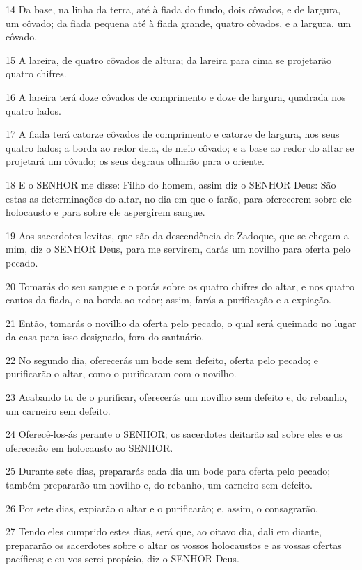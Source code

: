 \par 14 Da base, na linha da terra, até à fiada do fundo, dois côvados, e de largura, um côvado; da fiada pequena até à fiada grande, quatro côvados, e a largura, um côvado.
\par 15 A lareira, de quatro côvados de altura; da lareira para cima se projetarão quatro chifres.
\par 16 A lareira terá doze côvados de comprimento e doze de largura, quadrada nos quatro lados.
\par 17 A fiada terá catorze côvados de comprimento e catorze de largura, nos seus quatro lados; a borda ao redor dela, de meio côvado; e a base ao redor do altar se projetará um côvado; os seus degraus olharão para o oriente.
\par 18 E o SENHOR me disse: Filho do homem, assim diz o SENHOR Deus: São estas as determinações do altar, no dia em que o farão, para oferecerem sobre ele holocausto e para sobre ele aspergirem sangue.
\par 19 Aos sacerdotes levitas, que são da descendência de Zadoque, que se chegam a mim, diz o SENHOR Deus, para me servirem, darás um novilho para oferta pelo pecado.
\par 20 Tomarás do seu sangue e o porás sobre os quatro chifres do altar, e nos quatro cantos da fiada, e na borda ao redor; assim, farás a purificação e a expiação.
\par 21 Então, tomarás o novilho da oferta pelo pecado, o qual será queimado no lugar da casa para isso designado, fora do santuário.
\par 22 No segundo dia, oferecerás um bode sem defeito, oferta pelo pecado; e purificarão o altar, como o purificaram com o novilho.
\par 23 Acabando tu de o purificar, oferecerás um novilho sem defeito e, do rebanho, um carneiro sem defeito.
\par 24 Oferecê-los-ás perante o SENHOR; os sacerdotes deitarão sal sobre eles e os oferecerão em holocausto ao SENHOR.
\par 25 Durante sete dias, prepararás cada dia um bode para oferta pelo pecado; também prepararão um novilho e, do rebanho, um carneiro sem defeito.
\par 26 Por sete dias, expiarão o altar e o purificarão; e, assim, o consagrarão.
\par 27 Tendo eles cumprido estes dias, será que, ao oitavo dia, dali em diante, prepararão os sacerdotes sobre o altar os vossos holocaustos e as vossas ofertas pacíficas; e eu vos serei propício, diz o SENHOR Deus.

